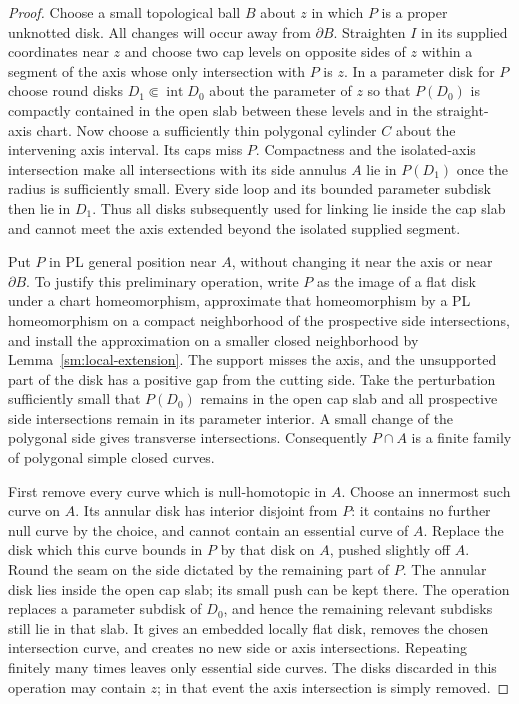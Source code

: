 \begin{proof}
Choose a small topological ball $B$ about $z$ in which $P$ is a proper
unknotted disk.  All changes will occur away from $\partial B$.
Straighten $I$ in its supplied coordinates near $z$ and choose two
cap levels on opposite sides of $z$ within a segment of the axis whose
only intersection with $P$ is $z$.  In a parameter disk for $P$ choose
round disks $D_1\Subset\operatorname{int}D_0$ about the parameter of
$z$ so that $P(D_0)$ is compactly contained in the open slab between
these levels and in the straight-axis chart.  Now choose a sufficiently
thin polygonal cylinder $C$ about the intervening axis interval.  Its
caps miss $P$.  Compactness and the isolated-axis intersection make
all intersections with its side annulus $A$ lie in $P(D_1)$ once
the radius is sufficiently small.  Every side loop and its bounded
parameter subdisk then lie in $D_1$.  Thus all disks subsequently used
for linking lie inside the cap slab and cannot meet the axis extended
beyond the isolated supplied segment.

Put $P$ in PL general position near $A$, without changing it near the
axis or near $\partial B$.  To justify this preliminary operation,
write $P$ as the image of a flat disk under a chart homeomorphism,
approximate that homeomorphism by a PL homeomorphism on a compact
neighborhood of the prospective side intersections, and install the
approximation on a smaller closed neighborhood by
Lemma~\ref{sm:local-extension}.  The support misses the axis, and the
unsupported part of the disk has a positive gap from the cutting side.
Take the perturbation sufficiently small that $P(D_0)$ remains in
the open cap slab and all prospective side intersections remain in
its parameter interior.  A small change of the polygonal side gives
transverse intersections.
Consequently $P\cap A$ is a finite family of polygonal simple closed
curves.

First remove every curve which is null-homotopic in $A$.  Choose an
innermost such curve on $A$.  Its annular disk has interior disjoint
from $P$: it contains no further null curve by the choice, and cannot
contain an essential curve of $A$.  Replace the disk which this curve
bounds in $P$ by that disk on $A$, pushed slightly off $A$.  Round the
seam on the side dictated by the remaining part of $P$.  The annular
disk lies inside the open cap slab; its small push can be kept there.
The operation replaces a parameter subdisk of $D_0$, and hence the
remaining relevant subdisks still lie in that slab.  It gives an
embedded locally flat disk, removes the chosen intersection curve, and
creates no new side or axis intersections.  Repeating finitely many
times leaves only essential side curves.  The disks discarded in this
operation may contain $z$; in that event the axis intersection is simply
removed.


\end{proof}
